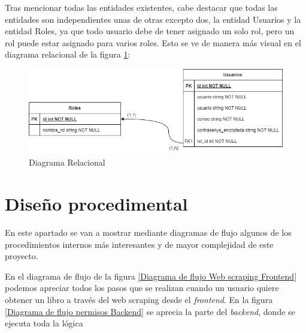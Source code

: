 Tras mencionar todas las entidades existentes, cabe destacar que todas las entidades son independientes unas de otras excepto dos, la entidad Usuarios y la entidad Roles, ya que todo usuario debe de tener asignado un solo rol, pero un rol puede estar asignado para varios roles. Esto se ve de manera más visual en el diagrama relacional de la figura \ref{Diagrama Relacional}:

\begin{figure}[htbp]
    \centering
    \includegraphics[width=0.9\linewidth]{Imagenes/Diagrama relacional.png}
    \caption{Diagrama Relacional}
    \label{Diagrama Relacional}
\end{figure}
\FloatBarrier

\section{Diseño procedimental}
En este apartado se van a mostrar mediante diagramas de flujo algunos de los procedimientos internos más interesantes y de mayor complejidad de este proyecto.

En el diagrama de flujo de la figura \ref{Diagrama de flujo Web scraping Frontend} podemos apreciar todos los pasos que se realizan cuando un usuario quiere obtener un libro a través del web scraping desde el \textit{frontend}. En la figura \ref{Diagrama de flujo permisos Backend} se aprecia la parte del \textit{backend}, donde se ejecuta toda la lógica

\newpage
